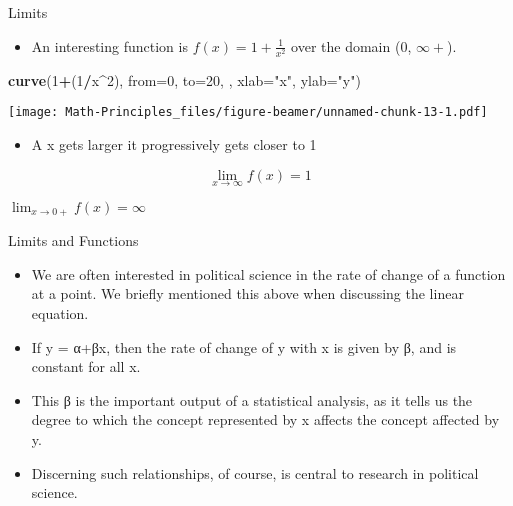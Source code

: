 \documentclass[
  ignorenonframetext,
]{beamer}
\newenvironment{Shaded}{\begin{snugshade}}{\end{snugshade}}
\newcommand{\DataTypeTok}[1]{\textcolor[rgb]{0.13,0.29,0.53}{#1}}
\newcommand{\DecValTok}[1]{\textcolor[rgb]{0.00,0.00,0.81}{#1}}
\newcommand{\KeywordTok}[1]{\textcolor[rgb]{0.13,0.29,0.53}{\textbf{#1}}}
\newcommand{\NormalTok}[1]{#1}
\newcommand{\OperatorTok}[1]{\textcolor[rgb]{0.81,0.36,0.00}{\textbf{#1}}}
\newcommand{\StringTok}[1]{\textcolor[rgb]{0.31,0.60,0.02}{#1}}
\providecommand{\tightlist}{%
  \setlength{\itemsep}{0pt}\setlength{\parskip}{0pt}}
\begin{document}
\begin{frame}[fragile]{Limits}
\protect\hypertarget{limits-3}{}

\begin{itemize}
\tightlist
\item
  An interesting function is \(f(x)= 1 + \frac{1}{x^{2}}\) over the
  domain (0, \(\infty+\)).
\end{itemize}

\begin{Shaded}
\begin{Highlighting}[]
\KeywordTok{curve}\NormalTok{(}\DecValTok{1}\OperatorTok{+}\NormalTok{(}\DecValTok{1}\OperatorTok{/}\NormalTok{x}\OperatorTok{^}\DecValTok{2}\NormalTok{), }\DataTypeTok{from=}\DecValTok{0}\NormalTok{, }\DataTypeTok{to=}\DecValTok{20}\NormalTok{, , }\DataTypeTok{xlab=}\StringTok{"x"}\NormalTok{, }\DataTypeTok{ylab=}\StringTok{"y"}\NormalTok{)}
\end{Highlighting}
\end{Shaded}

\texttt{[image: Math-Principles\_files/figure-beamer/unnamed-chunk-13-1.pdf]}

\begin{itemize}
\tightlist
\item
  A x gets larger it progressively gets closer to 1
\end{itemize}

\[\lim_{x \to \infty} f(x)=1\]

\(\lim_{x \to 0+} f(x)=\infty\)

\end{frame}

\begin{frame}{Limits and Functions}
\protect\hypertarget{limits-and-functions}{}

\begin{itemize}
\item
  We are often interested in political science in the rate of change of
  a function at a point. We briefly mentioned this above when discussing
  the linear equation.
\item
  If y = α+βx, then the rate of change of y with x is given by β, and is
  constant for all x.
\item
  This β is the important output of a statistical analysis, as it tells
  us the degree to which the concept represented by x affects the
  concept affected by y.
\item
  Discerning such relationships, of course, is central to research in
  political science.
\end{itemize}

\end{frame}
\end{document}
